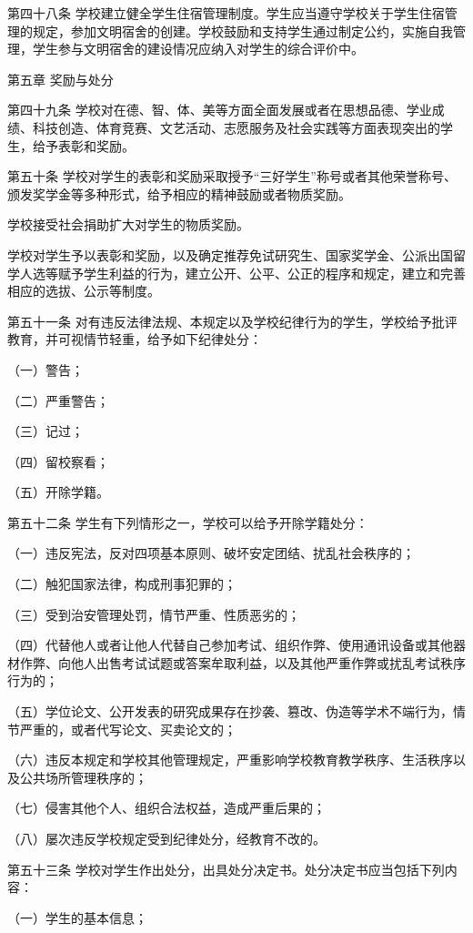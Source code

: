 \documentclass[UTF8,12pt,a4paper]{report}
\begin{document}
第四十八条 学校建立健全学生住宿管理制度。学生应当遵守学校关于学生住宿管理的规定，参加文明宿舍的创建。学校鼓励和支持学生通过制定公约，实施自我管理，学生参与文明宿舍的建设情况应纳入对学生的综合评价中。



第五章 奖励与处分

第四十九条 学校对在德、智、体、美等方面全面发展或者在思想品德、学业成绩、科技创造、体育竞赛、文艺活动、志愿服务及社会实践等方面表现突出的学生，给予表彰和奖励。

第五十条 学校对学生的表彰和奖励采取授予“三好学生”称号或者其他荣誉称号、颁发奖学金等多种形式，给予相应的精神鼓励或者物质奖励。

学校接受社会捐助扩大对学生的物质奖励。

学校对学生予以表彰和奖励，以及确定推荐免试研究生、国家奖学金、公派出国留学人选等赋予学生利益的行为，建立公开、公平、公正的程序和规定，建立和完善相应的选拔、公示等制度。

第五十一条 对有违反法律法规、本规定以及学校纪律行为的学生，学校给予批评教育，并可视情节轻重，给予如下纪律处分：

（一）警告；

（二）严重警告；

（三）记过；

（四）留校察看；

（五）开除学籍。

第五十二条 学生有下列情形之一，学校可以给予开除学籍处分：

（一）违反宪法，反对四项基本原则、破坏安定团结、扰乱社会秩序的；

（二）触犯国家法律，构成刑事犯罪的；

（三）受到治安管理处罚，情节严重、性质恶劣的；

（四）代替他人或者让他人代替自己参加考试、组织作弊、使用通讯设备或其他器材作弊、向他人出售考试试题或答案牟取利益，以及其他严重作弊或扰乱考试秩序行为的；

（五）学位论文、公开发表的研究成果存在抄袭、篡改、伪造等学术不端行为，情节严重的，或者代写论文、买卖论文的；

（六）违反本规定和学校其他管理规定，严重影响学校教育教学秩序、生活秩序以及公共场所管理秩序的；

（七）侵害其他个人、组织合法权益，造成严重后果的；

（八）屡次违反学校规定受到纪律处分，经教育不改的。

第五十三条 学校对学生作出处分，出具处分决定书。处分决定书应当包括下列内容：

（一）学生的基本信息；
\end{document}
